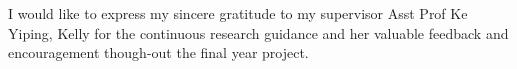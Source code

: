 
I would like to express my sincere gratitude to my supervisor Asst Prof Ke Yiping, Kelly for the continuous research guidance and her valuable feedback and encouragement though-out the final year project.